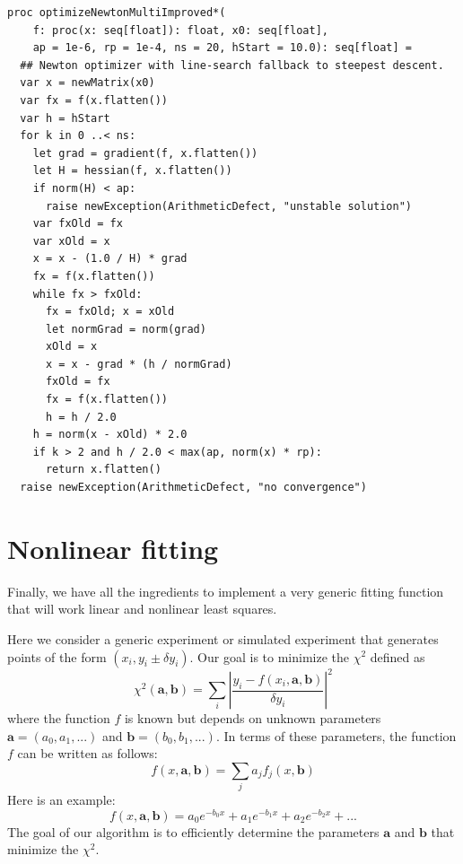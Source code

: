 \documentclass[justified, sixbynine]{tufte-book}
\def\ft{\small\tt}
\theoremstyle{plain}%
\newtheorem * {corollary}{Corollary}
\theoremstyle{definition}
\theoremstyle{remark}
\newtheorem * {remark}{Remark}
\newtheorem * {note}{Note}
\begin{document}
\begin{fullwidth}
\begin{lstlisting}[caption={in file: {\ft nlib/solvers.nim}}]
proc optimizeNewtonMultiImproved*(
    f: proc(x: seq[float]): float, x0: seq[float],
    ap = 1e-6, rp = 1e-4, ns = 20, hStart = 10.0): seq[float] =
  ## Newton optimizer with line-search fallback to steepest descent.
  var x = newMatrix(x0)
  var fx = f(x.flatten())
  var h = hStart
  for k in 0 ..< ns:
    let grad = gradient(f, x.flatten())
    let H = hessian(f, x.flatten())
    if norm(H) < ap:
      raise newException(ArithmeticDefect, "unstable solution")
    var fxOld = fx
    var xOld = x
    x = x - (1.0 / H) * grad
    fx = f(x.flatten())
    while fx > fxOld:
      fx = fxOld; x = xOld
      let normGrad = norm(grad)
      xOld = x
      x = x - grad * (h / normGrad)
      fxOld = fx
      fx = f(x.flatten())
      h = h / 2.0
    h = norm(x - xOld) * 2.0
    if k > 2 and h / 2.0 < max(ap, norm(x) * rp):
      return x.flatten()
  raise newException(ArithmeticDefect, "no convergence")
\end{lstlisting}

\goodbreak\section{Nonlinear fitting}

Finally, we have all the ingredients to implement a very generic fitting function that will work linear and nonlinear least squares.

Here we consider a generic experiment or simulated experiment that generates points of the form $(x_i, y_i \pm \delta y_i)$. Our goal is to minimize the $\chi^2$ defined as
\begin{equation}
\chi^2(\mathbf{a}, \mathbf{b}) = \sum _i \left|
\frac{y_i - f(x_i, \mathbf{a}, \mathbf{b})}{\delta y_i}
\right|^2
\end{equation}
where the function $f$ is known but depends on unknown parameters $\mathbf{a}=(a_0, a_1, ...)$ and $\mathbf{b}=(b_0, b_1, ...)$. In terms of these parameters, the function $f$ can be written as follows:
\begin{equation}
f(x, \mathbf{a}, \mathbf{b}) = \sum_j a_j f_j(x, \mathbf{b})
\end{equation}
Here is an example:
\begin{equation}
f(x, \mathbf{a}, \mathbf{b}) = a_0 e^{-b_0 x} + a_1 e^{-b_1 x} + a_2 e^{-b_2 x} + ...
\end{equation}
The goal of our algorithm is to efficiently determine the parameters $\mathbf{a}$ and $\mathbf{b}$ that minimize the $\chi^2$.


\end{fullwidth}
\end{document}
